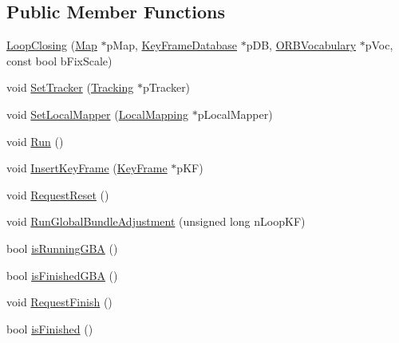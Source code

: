 \subsection*{Public Member Functions}
\begin{DoxyCompactItemize}
\item 
\mbox{\hyperlink{class_o_r_b___s_l_a_m2_1_1_loop_closing_af5f7b8a43efa8bc771a5227ed2fbf460}{Loop\+Closing}} (\mbox{\hyperlink{class_o_r_b___s_l_a_m2_1_1_map}{Map}} $\ast$p\+Map, \mbox{\hyperlink{class_o_r_b___s_l_a_m2_1_1_key_frame_database}{Key\+Frame\+Database}} $\ast$p\+DB, \mbox{\hyperlink{namespace_o_r_b___s_l_a_m2_a2fafba714858cab1bb18d438e2e83c5d}{O\+R\+B\+Vocabulary}} $\ast$p\+Voc, const bool b\+Fix\+Scale)
\item 
void \mbox{\hyperlink{class_o_r_b___s_l_a_m2_1_1_loop_closing_a20bce54d19c979511043d7c109aa741a}{Set\+Tracker}} (\mbox{\hyperlink{class_o_r_b___s_l_a_m2_1_1_tracking}{Tracking}} $\ast$p\+Tracker)
\item 
void \mbox{\hyperlink{class_o_r_b___s_l_a_m2_1_1_loop_closing_aa27124f61055c2b5f53497e918195269}{Set\+Local\+Mapper}} (\mbox{\hyperlink{class_o_r_b___s_l_a_m2_1_1_local_mapping}{Local\+Mapping}} $\ast$p\+Local\+Mapper)
\item 
void \mbox{\hyperlink{class_o_r_b___s_l_a_m2_1_1_loop_closing_a520014f22059056d6256476bccb04471}{Run}} ()
\item 
void \mbox{\hyperlink{class_o_r_b___s_l_a_m2_1_1_loop_closing_a680d0b255d764754841e622f5af97473}{Insert\+Key\+Frame}} (\mbox{\hyperlink{class_o_r_b___s_l_a_m2_1_1_key_frame}{Key\+Frame}} $\ast$p\+KF)
\item 
void \mbox{\hyperlink{class_o_r_b___s_l_a_m2_1_1_loop_closing_a7dc868b9f4b8381a94aae2c85bfec3c5}{Request\+Reset}} ()
\item 
void \mbox{\hyperlink{class_o_r_b___s_l_a_m2_1_1_loop_closing_a4b10a9c18541818c9490a62447ef7f18}{Run\+Global\+Bundle\+Adjustment}} (unsigned long n\+Loop\+KF)
\item 
bool \mbox{\hyperlink{class_o_r_b___s_l_a_m2_1_1_loop_closing_a4ddc6674aa54db7d38946f73eb9776f2}{is\+Running\+G\+BA}} ()
\item 
bool \mbox{\hyperlink{class_o_r_b___s_l_a_m2_1_1_loop_closing_aa8efb239cd4b488b12e7f1223c308a4e}{is\+Finished\+G\+BA}} ()
\item 
void \mbox{\hyperlink{class_o_r_b___s_l_a_m2_1_1_loop_closing_aa271039dcafe7cc053f72ba541bc499b}{Request\+Finish}} ()
\item 
bool \mbox{\hyperlink{class_o_r_b___s_l_a_m2_1_1_loop_closing_ac242214c60ed66e9432e0457e3fc29ad}{is\+Finished}} ()
\end{DoxyCompactItemize}
